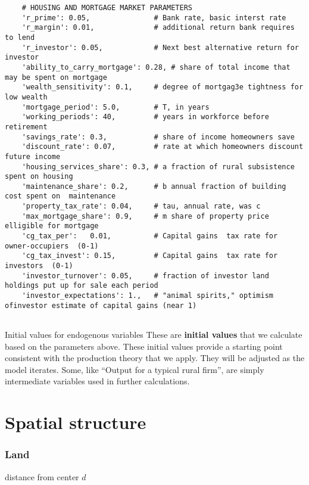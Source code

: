 {\begin{verbatim}
    # HOUSING AND MORTGAGE MARKET PARAMETERS
    'r_prime': 0.05,               # Bank rate, basic interst rate
    'r_margin': 0.01,              # additional return bank requires to lend
    'r_investor': 0.05,            # Next best alternative return for investor
    'ability_to_carry_mortgage': 0.28, # share of total income that may be spent on mortgage
    'wealth_sensitivity': 0.1,     # degree of mortgag3e tightness for low wealth
    'mortgage_period': 5.0,        # T, in years
    'working_periods': 40,         # years in workforce before retirement
    'savings_rate': 0.3,           # share of income homeowners save
    'discount_rate': 0.07,         # rate at which homeowners discount future income
    'housing_services_share': 0.3, # a fraction of rural subsistence spent on housing
    'maintenance_share': 0.2,      # b annual fraction of building cost spent on  maintenance
    'property_tax_rate': 0.04,     # tau, annual rate, was c
    'max_mortgage_share': 0.9,     # m share of property price elligible for mortgage
    'cg_tax_per':   0.01,          # Capital gains  tax rate for owner-occupiers  (0-1)
    'cg_tax_invest': 0.15,         # Capital gains  tax rate for investors  (0-1)
    'investor_turnover': 0.05,     # fraction of investor land holdings put up for sale each period
    'investor_expectations': 1.,   # "animal spirits," optimism ofinvestor estimate of capital gains (near 1)
    
\end{verbatim} }

Initial values for endogenous variables
These are \textbf{initial values} that we calculate based on the parameters above. These initial values provide a starting point consistent with the production theory that we apply. They will be adjusted as the model iterates.  Some, like ``Output for a typical rural firm'', are simply intermediate variables used in further calculations.%



\section{Spatial structure}

\subsubsection{Land}
\begin{description}
\item[distance from center  $d$] 
\end{description}


